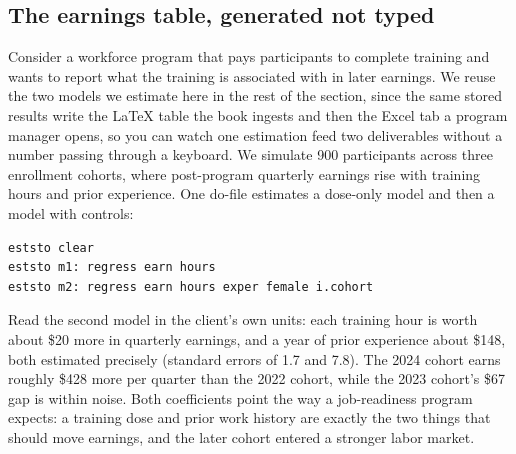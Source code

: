 \documentclass[
    a4paper,
    fontsize=10pt,
    twoside=true,
    numbers=noenddot,
]{kaobook}
\begin{document}
\subsection{The earnings table, generated not typed}\label{sec:ch11-worked-example}
Consider a workforce program that pays participants to complete training and wants to report what the training is associated with in later earnings. We reuse the two models we estimate here in the rest of the section, since the same stored results write the \LaTeX{} table the book ingests and then the Excel tab a program manager opens, so you can watch one estimation feed two deliverables without a number passing through a keyboard. We simulate 900 participants across three enrollment cohorts, where post-program quarterly earnings rise with training hours and prior experience. One do-file estimates a dose-only model and then a model with controls:
\par
{\footnotesize
\begin{verbatim}
eststo clear
eststo m1: regress earn hours
eststo m2: regress earn hours exper female i.cohort
\end{verbatim}
}
Read the second model in the client's own units: each training hour is worth about \$20 more in quarterly earnings, and a year of prior experience about \$148, both estimated precisely (standard errors of 1.7 and 7.8). The 2024 cohort earns roughly \$428 more per quarter than the 2022 cohort, while the 2023 cohort's \$67 gap is within noise. Both coefficients point the way a job-readiness program expects: a training dose and prior work history are exactly the two things that should move earnings, and the later cohort entered a stronger labor market.
\end{document}
